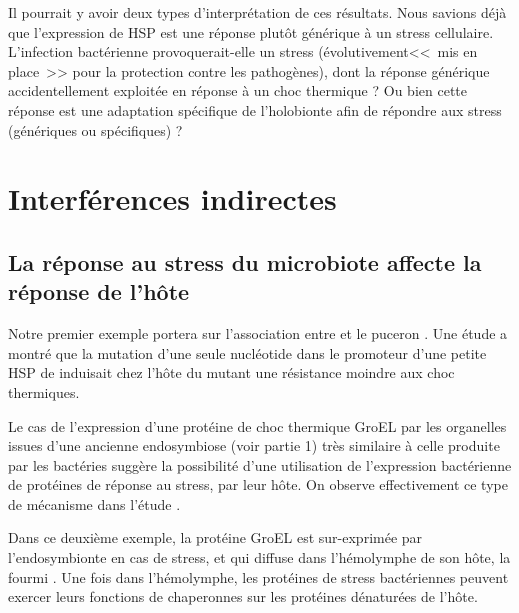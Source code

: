Il pourrait y avoir deux types d'interprétation de ces résultats.
Nous savions déjà que l'expression de HSP est une réponse plutôt générique à un stress cellulaire.
L'infection bactérienne provoquerait-elle un stress (évolutivement<<~mis en place~>> pour la protection contre les pathogènes), dont la réponse générique accidentellement exploitée en réponse à un choc thermique ?
Ou bien cette réponse est une adaptation spécifique de l'holobionte afin de répondre aux stress (génériques ou spécifiques) ?

	\section{Interférences indirectes} %
	 	\label{sec:indirect}

\subsection{La réponse au stress du microbiote affecte la réponse de l'hôte} %
\label{sub:groel}


Notre premier exemple portera sur l'association entre  et le
puceron . Une étude \cite{dunbar2007} a montré que la mutation d'une seule nucléotide dans le promoteur d'une petite HSP de  induisait
chez l'hôte du mutant une résistance moindre aux choc thermiques.

Le cas de l'expression d'une protéine de choc thermique GroEL par les
organelles issues d'une ancienne endosymbiose (voir partie
1) très similaire à celle produite par les bactéries
suggère la possibilité d'une utilisation de l'expression bactérienne de
protéines de réponse au stress, par leur hôte. 
On observe effectivement ce type de mécanisme dans l'étude \cite{stoll2009}.


Dans ce deuxième exemple, la protéine GroEL est sur-exprimée par
l'endosymbionte  en cas de stress, et qui diffuse
dans l'hémolymphe de son hôte, la fourmi .
Une fois dans l'hémolymphe, les protéines de stress bactériennes peuvent
exercer leurs fonctions de chaperonnes sur les protéines dénaturées de l'hôte. 




